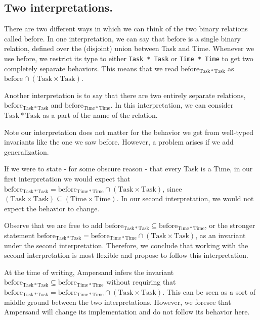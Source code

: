 \documentclass[12pt]{article}
\begin{document}
\subsection{Two interpretations.}
There are two different ways in which we can think of the two binary relations called $\mathrm{before}$.
In one interpretation, we can say that $\mathrm{before}$ is a single binary relation, defined over the (disjoint) union between Task and Time.
Whenever we use $\mathrm{before}$, we restrict its type to either \verb=Task * Task= or \verb=Time * Time= to get two completely separate behaviors.
This means that we read $\mathrm{before}_{\mathrm{Task * Task}}$ as $\mathrm{before} \cap (\mathrm{Task}\times\mathrm{Task})$.

Another interpretation is to say that there are two entirely separate relations, $\mathrm{before}_{\mathrm{Task * Task}}$ and $\mathrm{before}_{\mathrm{Time * Time}}$.
In this interpretation, we can consider ${\mathrm{Task * Task}}$ as a part of the name of the relation.

Note our interpretation does not matter for the behavior we get from well-typed invariants like the one we saw before.
However, a problem arises if we add generalization.

If we were to state - for some obscure reason - that every Task is a Time, in our first interpretation we would expect that $\mathrm{before}_{\mathrm{Task * Task}} = \mathrm{before}_{\mathrm{Time * Time}} \cap (\mathrm{Task}\times\mathrm{Task})$, since $(\mathrm{Task}\times\mathrm{Task}) \subseteq (\mathrm{Time}\times\mathrm{Time})$.
In our second interpretation, we would not expect the behavior to change.

Observe that we are free to add $\mathrm{before}_{\mathrm{Task * Task}} \subseteq \mathrm{before}_{\mathrm{Time * Time}}$, or the stronger statement $\mathrm{before}_{\mathrm{Task * Task}} = \mathrm{before}_{\mathrm{Time * Time}} \cap (\mathrm{Task}\times\mathrm{Task})$, as an invariant under the second interpretation.
Therefore, we conclude that working with the second interpretation is most flexible and propose to follow this interpretation.

At the time of writing, Ampersand infers the invariant $\mathrm{before}_{\mathrm{Task * Task}} \subseteq \mathrm{before}_{\mathrm{Time * Time}}$ without requiring that $\mathrm{before}_{\mathrm{Task * Task}} = \mathrm{before}_{\mathrm{Time * Time}} \cap (\mathrm{Task}\times\mathrm{Task})$. This can be seen as a sort of middle ground between the two interpretations. However, we foresee that Ampersand will change its implementation and do not follow its behavior here.
\end{document}
